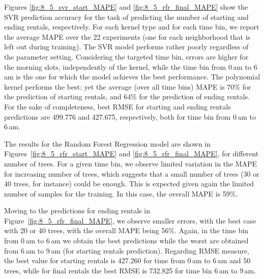 Figures \ref{fig:8_5_svr_start_MAPE} and \ref{fig:8_5_rfr_final_MAPE} show the SVR prediction accuracy for the task of predicting the number of starting and ending rentals, respectively. For each kernel type and for each time bin, we report the average MAPE over the 22 experiments (one for each neighborhood that is left out during training). The SVR model performs rather poorly regardless of the parameter setting. Considering the targeted time bin, errors are higher for the morning slots, independently of the kernel, while the time bin from 0\,am to 6\,am is the one for which the model achieves the best performance. The polynomial kernel performs the best: yet the average (over all time bins) MAPE is 70\% for the prediction of starting rentals, and 64\% for the prediction of ending rentals. For the sake of completeness, best RMSE for starting and ending rentals predictions are 499.776 and 427.675, respectively, both for time bin from 0\,am to 6\,am.


The results for the Random Forest Regression model are shown in Figures~\ref{fig:8_5_rfr_start_MAPE} and  \ref{fig:8_5_rfr_final_MAPE}, for different number of trees. For a given time bin, we observe limited variation in the MAPE for increasing number of trees, which suggests that a small number of trees (30 or 40 trees, for instance) could be enough. This is expected given again the limited number of samples for the training. In this case, the overall MAPE is 59\%.

Moving to the predictions for ending rentals in Figure~\ref{fig:8_5_rfr_final_MAPE}, we observe smaller errors, with the best case with 20 or 40 trees, with the overall MAPE being 56\%. Again, in the time bin from 0\,am to 6\,am we obtain the best predictions while the worst are obtained from 6\,am to 9\,am (for starting rentals prediction).  Regarding RMSE measure, the best value for starting rentals is 427.260 for time from 0\,am to 6\,am and 50 trees, while for final rentals the best RMSE is 732.825 for time bin 6\,am to 9\,am.

